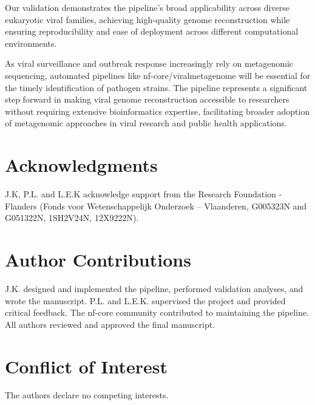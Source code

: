 Our validation demonstrates the pipeline's broad applicability across diverse eukaryotic viral families, achieving high-quality genome reconstruction while ensuring reproducibility and ease of deployment across different computational environments.

As viral surveillance and outbreak response increasingly rely on metagenomic sequencing, automated pipelines like nf-core/viralmetagenome will be essential for the timely identification of pathogen strains. The pipeline represents a significant step forward in making viral genome reconstruction accessible to researchers without requiring extensive bioinformatics expertise, facilitating broader adoption of metagenomic approaches in viral research and public health applications.


\section*{Acknowledgments}
 J.K, P.L. and L.E.K  acknowledge support from the Research Foundation - Flanders (Fonds voor Wetenschappelijk Onderzoek – Vlaanderen, G005323N and G051322N, 1SH2V24N, 12X9222N).

\section*{Author Contributions}
J.K. designed and implemented the pipeline, performed validation analyses, and wrote the manuscript. P.L. and L.E.K. supervised the project and provided critical feedback. The nf-core community contributed to maintaining the pipeline. All authors reviewed and approved the final manuscript.

\section*{Conflict of Interest}
The authors declare no competing interests.

